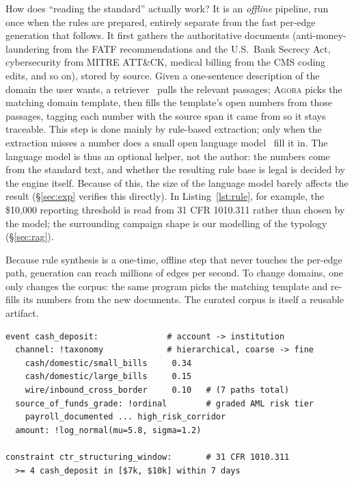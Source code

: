 \documentclass[sigconf,review,anonymous]{acmart}
\newcommand{\sys}{\textsc{Agora}\xspace}
\begin{document}
How does ``reading the standard'' actually work? It is an \emph{offline} pipeline, run
once when the rules are prepared, entirely separate from the fast per-edge generation
that follows. It first gathers the authoritative documents (anti-money-laundering from
the FATF recommendations and the U.S.\ Bank Secrecy Act, cybersecurity from MITRE
ATT\&CK, medical billing from the CMS coding edits, and so on), stored by source. Given
a one-sentence description of the domain the user wants, a
retriever~\cite{robertson2009bm25,johnson2021faiss,lewis2020rag} pulls the relevant
passages; \sys{} picks the matching domain template, then fills the template's open
numbers from those passages, tagging each number with the source span it came from so
it stays traceable. This step is done mainly by rule-based extraction; only when the
extraction misses a number does a small open language model~\cite{qwen2024report} fill
it in. The language model is thus an optional helper, not the author: the numbers come
from the standard text, and whether the resulting rule base is legal is decided by the
engine itself. Because of this, the size of the language model barely affects the
result (\S\ref{sec:exp} verifies this directly). In Listing~\ref{lst:rule}, for example,
the \$10{,}000 reporting threshold is read from 31 CFR 1010.311 rather than chosen by the
model; the surrounding campaign shape is our modelling of the typology (\S\ref{sec:rag}).

Because rule synthesis is a one-time, offline step that never touches the per-edge
path, generation can reach millions of edges per second. To change domains, one only
changes the corpus: the same program picks the matching template and re-fills its
numbers from the new documents. The curated corpus is itself a reusable artifact.

\begin{lstlisting}[float=t,caption={The compiled \texttt{cash\_deposit} rule (finance,
abridged). The hierarchical \texttt{channel} taxonomy and the graded
\texttt{source\_of\_funds\_grade} give the edge its multi-level attributes; the
\$10k threshold is grounded in 31 CFR while the campaign shape around it is a modelling
choice.},label={lst:rule}]
event cash_deposit:              # account -> institution
  channel: !taxonomy             # hierarchical, coarse -> fine
    cash/domestic/small_bills     0.34
    cash/domestic/large_bills     0.15
    wire/inbound_cross_border     0.10   # (7 paths total)
  source_of_funds_grade: !ordinal        # graded AML risk tier
    payroll_documented ... high_risk_corridor
  amount: !log_normal(mu=5.8, sigma=1.2)

constraint ctr_structuring_window:       # 31 CFR 1010.311
  >= 4 cash_deposit in [$7k, $10k] within 7 days
\end{lstlisting}
\end{document}
